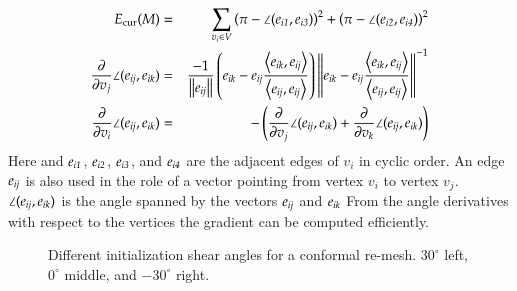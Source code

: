 \documentclass[Thesis.tex]{subfiles}
\begin{document}
\begin{eqnarray*}
	E_{\textrm{\scriptsize{cur}}}(M) &=& \sum_{v_i\in V} \left(\pi - \angle(e_{\mathrm{\it{i1}}}, e_{\mathrm{\it{i3}}}) \right)^2 
	+ \left(\pi - \angle(e_{\mathrm{\it{i2}}}, e_{\mathrm{\it{i4}}}) \right)^2 \\
	\frac{\partial}{\partial v_j}\angle(e_{\mathrm{\it{ij}}},e_{\mathrm{\it{ik}}}) &=& 
	\frac{-1}{\left\Vert e_{\mathrm{\it{ij}}}\right\Vert}\left(e_{\mathrm{\it{ik}}}-e_{\mathrm{\it{ij}}}\frac{\left<e_{\mathrm{\it{ik}}},e_{\mathrm{\it{ij}}}\right>}{\left<e_{\mathrm{\it{ij}}},e_{\mathrm{\it{ij}}}\right>}\right)
	\left\Vert e_{\mathrm{\it{ik}}}-e_{\mathrm{\it{ij}}}\frac{\left<e_{\mathrm{\it{ik}}},e_{\mathrm{\it{ij}}}\right>}		
	{\left<e_{\mathrm{\it{ij}}},e_{\mathrm{\it{ij}}}\right>} \right\Vert^{-1} \\
	\frac{\partial}{\partial v_i}\angle(e_{\mathrm{\it{ij}}},e_{\mathrm{\it{ik}}}) &=& 
	- \left(\frac{\partial}{\partial v_j}\angle(e_{\mathrm{\it{ij}}},e_{\mathrm{\it{ik}}}) + 
	\frac{\partial}{\partial v_k}\angle(e_{\mathrm{\it{ij}}},e_{\mathrm{\it{ik}}})\right)
\end{eqnarray*}
Here and $e_{\mathrm{\it{i1}}}$, $e_{\mathrm{\it{i2}}}$, $e_{\mathrm{\it{i3}}}$, and $e_{\mathrm{\it{i4}}}$ are the adjacent edges of $v_i$ in cyclic order. An edge $e_{\mathrm{\it{ij}}}$ is also used in the role of a vector pointing from vertex $v_i$ to vertex $v_j$. $\angle(e_{\mathrm{\it{ij}}},e_{\mathrm{\it{ik}}})$ is the angle spanned by the vectors $e_{\mathrm{\it{ij}}}$ and $e_{\mathrm{\it{ik}}}$  From the angle derivatives with respect to the vertices the gradient can be computed efficiently.

\begin{figure}
\centering
{}
\caption{Different initialization shear angles for a conformal re-mesh. $30^\circ$ left, $0^\circ$ middle, and $-30^\circ$ right.}
\label{fig:initial_grids}
\end{figure}
\end{document}
